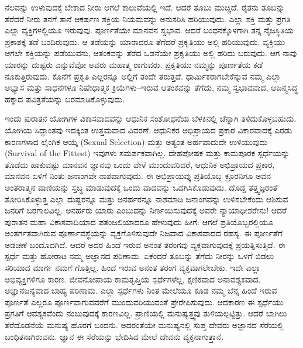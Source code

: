 \vspace{-0.35cm}


\vspace{0.2cm}

ನೆಲವನ್ನು ಉಳುವುದಕ್ಕೆ ಬೇಕಾದ ನೀರು ಆಗಲೆ ಕಾಲುವೆಯಲ್ಲಿ ಇದೆ. ಆದರೆ ತೂಬು ಮುಚ್ಚಿದೆ. ರೈತನು ತೂಬನ್ನು ತೆರೆದರೆ ನೀರು ತನಗೆ ತಾನೆ ಆಕರ್ಷಣ ಶಕ್ತಿಯ ನಿಯಮವನ್ನು ಅನುಸರಿಸಿ ಹರಿಯುವುದು. ಎಲ್ಲಾ ಶಕ್ತಿ ಮತ್ತು ಪ್ರಗತಿ ಎಲ್ಲಾ ವ್ಯಕ್ತಿಗಳಲ್ಲಿಯೂ ಇರುವುವು. ಪೂರ್ಣತೆಯೇ ಮಾನವನ ಸ್ವಭಾವ. ಆದರೆ ಬಂಧನಕ್ಕೊಳಗಾಗಿ ತನ್ನ ನೈಜಸ್ಥಿತಿಯ ಪ್ರಕಾಶಕ್ಕೆ ತಡೆ ಬಂದಿರುವುದು. ಆ ತಡೆಯನ್ನು ಯಾರಾದರೂ ತೆಗೆದರೆ ಪ್ರಕೃತಿಯು ಅಲ್ಲಿ ಹರಿಯುವುದು. ವ್ಯಕ್ತಿಯು ಆಗಲೇ ಶಕ್ತಿಯನ್ನು ಪಡೆಯುವನು, ಆತಂಕವನ್ನು ತೆರೆದ ಒಡನೆಯೇ ಪ್ರಕೃತಿಯು ಅಲ್ಲಿ ಹರಿದು ಬರುವುದು. ಆಗ ನಾವು ಯಾರನ್ನು ದುಷ್ಟರು ಎನ್ನುವೆವೋ ಅವರು ಮಹಾತ್ಮ ರಾಗುವರು. ಪ್ರಕೃತಿಯು ನಮ್ಮನ್ನು ಪೂರ್ಣತೆಯ ಕಡೆ ನೂಕುತ್ತಿರುವುದು. ಕೊನೆಗೆ ಪ್ರಕೃತಿ ಎಲ್ಲರನ್ನೂ ಅಲ್ಲಿಗೆ ತಂದೇ ತರುತ್ತದೆ. ಧಾರ್ಮಿಕರಾಗಬೇಕೆನ್ನುವ ನಮ್ಮ ಎಲ್ಲಾ ಅಭ್ಯಾಸ ಮತ್ತು ಸಾಧನೆಗಳೂ ನಿಷೇಧಾತ್ಮಕ ಕ್ರಿಯೆಗಳು–ಇರುವ ಆತಂಕವನ್ನು ತೆಗೆದು, ನಮ್ಮ ಸ್ವಭಾವವಾದ, ಆಜನ್ಮಸಿದ್ಧ ಹಕ್ಕಾದ ಪವಿತ್ರತೆಯನ್ನು ಬರಮಾಡಿಕೊಳ್ಳುವುದು. 

\vspace{0.2cm}

ಇಂದು ಪುರಾತನ ಯೋಗಿಗಳ ವಿಕಾಸವಾದವನ್ನು ಆಧುನಿಕ ಸಂಶೋಧನೆಯ ಬೆಳಕಿನಲ್ಲಿ ಚೆನ್ನಾಗಿ ತಿಳಿದುಕೊಳ್ಳಬಹುದು. ಯೋಗಿಯ ಸಿದ್ಧಾಂತವು ಇದಕ್ಕಿಂತ ಉತ್ತಮವಾದ ವಿವರಣೆ. ಆಧುನಿಕರ ಅಭಿಪ್ರಾಯದ ಪ್ರಕಾರ ವಿಕಾರವಾದಕ್ಕೆ ಎರಡು ಕಾರಣಗಳಾದ ಲೈಂಗಿಕ ಆಯ್ಕೆ (Sexual Selection) ಮತ್ತು ಅತ್ಯಂತ ಅರ್ಹವಾದುದೇ ಉಳಿಯುವುದು (Survival of the Fittest) ಇವುಗಳು ಸಮರ್ಪಕವಾಗಿಲ್ಲ. ದೇಹಪೋಷಕ ಮತ್ತು ಕಾಮಪೂರಕ ಸ್ಪರ್ಧೆಯನ್ನು ತೊಡೆದು ಹಾಕುವಷ್ಟು ಮಾನವನ ಜ್ಞಾನವು ಒಂದು ವೇಳೆ ಮುಂದುವರಿದರೆ, ಆಧುನಿಕ ಅಭಿಪ್ರಾಯದ ಪ್ರಕಾರ, ಮಾನವನ ಏಳಿಗೆ ನಿಂತು ಜನಾಂಗವೇ ನಾಶವಾಗುವುದು. ಈ ಅಭಿಪ್ರಾಯವ್ಕು ಪ್ರತಿಯೊಬ್ಬ ಕ್ರೂರನಿಗೂ ಅವನ ಅಂತರಾತ್ಮನ ವಾಣಿಯನ್ನು ಸ್ತಬ್ಧ ಮಾಡುವುದಕ್ಕೆ ಒಂದು ವಾದವನ್ನು ಒದಗಿಸಿಕೊಡುವುದು. ದೊಡ್ಡ ತತ್ತ್ವಜ್ಞರಂತೆ ತೋರಿಸಿಕೊಳ್ಳುತ್ತ ಎಲ್ಲಾ ದುಷ್ಟರನ್ನೂ ಮತ್ತು ಅನರ್ಹರನ್ನೂ ನಾಶಮಾಡಿ ಜನಾಂಗವನ್ನು ಉಳಿಸಬೇಕೆಂದು ಆಶಿಸುವ ಜನರಿಗೆ ಬರಗಾಲವಿಲ್ಲ. ಅನರ್ಹರು ಯಾರು ಎಂಬುದನ್ನು ನಿರ್ಣಯಿಸುವುದಕ್ಕೆ ಅವರೇ ನ್ಯಾಯಾಧೀಶರೇನು! ಆದರೆ ಪುರಾತನ ಮಹಾ ವಿಕಾಸವಾದಿಯಾದ ಪತಂಜಲಿಯಾದರೂ ಹೇಳುವುದು ಹೀಗೆ: ಆಗಲೆ ಪ್ರತಿಯೊಬ್ಬರಲ್ಲಿಯೂ ಅಂತರ್ಗತವಾಗಿರುವ ಪೂರ್ಣಾವಸ್ಥೆಯನ್ನು ವ್ಯಕ್ತಗೊಳಿಸುವುದೇ ನಿಜವಾದ ವಿಕಾಸವಾದದ ರಹಸ್ಯ. ಈ ಪೂರ್ಣತೆಗೆ ಅಡಚಣೆ ಬಂದೊದಗಿದೆ. ಆದರೆ ಅದರ ಹಿಂದೆ ಇರುವ ಅನಂತ ತರಂಗವು ವ್ಯಕ್ತವಾಗುವುದಕ್ಕೆ ಪ್ರಯತ್ನಿಸುತ್ತಿದೆ. ಈ ಸ್ಪರ್ಧೆ ಮತ್ತು ಹೋರಾಟ ನಮ್ಮ ಅಜ್ಞಾನದ ಪರಿಣಾಮ. ಏಕೆಂದರೆ ತೂಬನ್ನು ತೆಗೆದು ನೀರನ್ನು ಒಳಗೆ ಬಿಡಲು ಸರಿಯಾದ ಮಾರ್ಗ ನಮಗೆ ಗೊತ್ತಿಲ್ಲ. ಹಿಂದೆ ಇರುವ ಅನಂತ ತರಂಗ ವ್ಯಕ್ತವಾಗಲೇಬೇಕು. ಇದೇ ಎಲ್ಲಾ ಅಭಿವ್ಯಕ್ತಿಗಳಿಗೂ ಕಾರಣ. ಜೀವನೋಪಾಯ ಕಾಮತೃಪ್ತಿಯ ಸ್ಪರ್ಧೆಗಳೆಲ್ಲ, ಕ್ಷಣಿಕವಾದ ಅನಾವಶ್ಯಕವಾದ, ಅಜ್ಞಾನಜನ್ಯವಾದ ಬಾಹ್ಯ ಪರಿಣಾಮ. ಎಲ್ಲಾ ಸ್ಫರ್ಧೆಗಳು ನಿಂತ ಮೇಲೆಯೂ ಕೂಡ ನಮ್ಮ ಬೆನ್ನ ಹಿಂದೆ ಇರುವ ಪೂರ್ಣತೆ ಎಲ್ಲರೂ ಪೂರ್ಣವಾಗುವವರೆಗೆ ಮುಂದುವರಿಯುವಂತೆ ಪ್ರೇರೇಪಿಸುವುದು. ಆದಕಾರಣ ಈ ಸ್ಪರ್ಧೆಯು ಪ್ರಗತಿಗೆ ಆವಶ್ಯಕವೆಂದು ನಂಬುವುದಕ್ಕೆ ಕಾರಣವಿಲ್ಲ. ಪ್ರಾಣಿಯಲ್ಲಿ ಮನುಷ್ಯತ್ತ್ವವು ತುಳಿಯಲ್ಪಟ್ಟಿತ್ತು. ಆದರೆ ಬಾಗಿಲು ತೆರೆದೊಡನೆಯೆ ಮನುಷ್ಯ ಹೊರಗೆ ಬಂದನು. ಅದರಂತೆಯೇ ಮನುಷ್ಯನಲ್ಲಿ ಸುಪ್ತ ದೇವರು ಅಜ್ಞಾನದ ಸೆರೆಯಲ್ಲಿ ಬಂಧಿತನಾಗಿರುವನು. ಜ್ಞಾನ ಈ ಸೆರೆಯನ್ನು ಭೇದಿಸಿದ ಮೇಲೆ ದೇವನು ವ್ಯಕ್ತನಾಗುತ್ತಾನೆ. 

